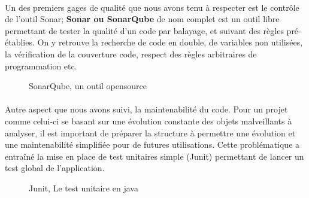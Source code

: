 \documentclass[a4paper, 12pt]{book}
\begin{document}
\paragraph{}
Un des premiers gages de qualité que nous avons tenu à respecter est le contrôle de l'outil Sonar; \textbf{Sonar ou SonarQube} de nom complet est un outil libre permettant de tester la qualité d'un code par balayage, et suivant des règles pré-établies. On y retrouve la recherche de code en double, de variables non utilisées, la vérification de la couverture code, respect des règles arbitraires de programmation etc.

\begin{figure}[!h] 	
    \caption{SonarQube, un outil opensource}
\end{figure}

\paragraph{}
Autre aspect que nous avons suivi, la maintenabilité du code. Pour un projet comme celui-ci se basant sur une évolution constante des objets malveillants à analyser, il est important de préparer la structure à permettre une évolution et une maintenabilité simplifiée pour de futures utilisations. Cette problématique a entraîné la mise en place de test unitaires simple (Junit) permettant de lancer un test global de l'application.
\begin{figure}[!h] 	
    \caption{Junit, Le test unitaire en java}
\end{figure}
\paragraph{}
\end{document}
